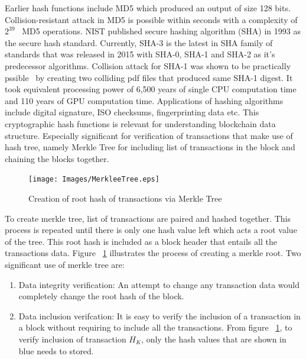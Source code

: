 Earlier hash functions include MD5 which produced an output of size 128 bits.
Collision-resistant attack in MD5 is possible within seconds with a complexity
of $2^{39}$~\cite{wang2005break} MD5 operations. NIST published secure hashing algorithm (SHA)
in 1993 as the secure hash standard. Currently, SHA-3 is the latest in SHA
family of standards that was released in 2015 with SHA-0, SHA-1 and SHA-2 as
it's predecessor algorithms. Collision attack for SHA-1 was shown to be
practically pssible~\cite{stevens2017first} by creating two colliding pdf files
that produced same SHA-1 digest. It took equivalent processing power of 6,500
years of single CPU computation time and 110 years of GPU computation time.
Applications of hashing algorithms include digital signature, ISO checksums,
fingerprinting data etc. This cryptographic hash functions is relevant for
understanding blockchain data structure. Especially significant for
verification of transactions that make use of hash tree, namely Merkle Tree for
including list of transactions in the block and chaining the blocks together.
\begin{figure}
	\begin{center}
		\texttt{[image: Images/MerkleeTree.eps]}
		\caption{Creation of root hash of transactions via Merkle Tree}
		\label{fig:merkleTree}
	\end{center}
\end{figure}
To create merkle tree, list of transactions are paired and hashed together.
This process is repeated until there is only one hash value left which acts a
root value of the tree. This root hash is included as a block header that
entails all the transactions data. Figure ~\ref{fig:merkleTree} illustrates the
process of creating a merkle root. 
Two significant use of merkle tree are: \\
\begin{enumerate}
	\item Data integrity verification: An attempt to change any transaction data
		would completely change the root hash of the block.  
	\item Data inclusion verifcation: It is easy to verify the inclusion of a
		transaction in a block without requiring to include all the
		transactions. From figure ~\ref{fig:merkleTree}, to verify inclusion of
		transaction $H_{K}$, only the hash values that are shown in blue needs to
		stored.  \\
\end{enumerate}

